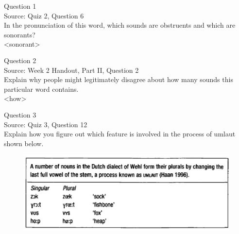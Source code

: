 \documentclass[12pt]{article}
\begin{document}
\begin{center}
\textbf{{\color{blue}{\HUGE START OF EXAM\\}}}

\textbf{{\color{blue}{\HUGE Student ID: 84480\\}}}

\textbf{{\color{blue}{\HUGE \\}}}

\end{center}
\newpage

{\large Question 1}\\

Source: Quiz 2, Question 6\\

In the pronunciation of this word, which sounds are obstruents and which are sonorants?\\

<sonorant>


\newpage

{\large Question 2}\\

Source: Week 2 Handout, Part II, Question 2\\

Explain why people might legitimately disagree about how many sounds this particular word contains.\\

<how>


\newpage

{\large Question 3}\\

Source: Quiz 3, Question 12\\

Explain how you figure out which feature is involved in the process of umlaut shown below.\\

\begin{figure}[H]
\includegraphics{../images/dutch.png}
\end{figure}
\end{document}
